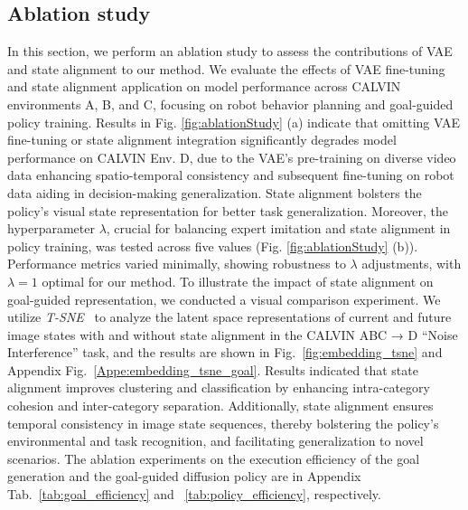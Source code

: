 \vspace{-0.5em}
\subsection{Ablation study}
\vspace{-0.5em}

In this section, we perform an ablation study to assess the contributions of VAE and state alignment to our method. 
We evaluate the effects of VAE fine-tuning and state alignment application on model performance across CALVIN environments A, B, and C, focusing on robot behavior planning and goal-guided policy training.
%
Results in Fig. \ref{fig:ablationStudy} (a) indicate that omitting VAE fine-tuning or state alignment integration significantly degrades model performance on CALVIN Env. D, due to the VAE's pre-training on diverse video data enhancing spatio-temporal consistency and subsequent fine-tuning on robot data aiding in decision-making generalization. 
State alignment bolsters the policy's visual state representation for better task generalization.
%
Moreover, the hyperparameter $\lambda$, crucial for balancing expert imitation and state alignment in policy training, was tested across five values (Fig. \ref{fig:ablationStudy} (b)). 
Performance metrics varied minimally, showing robustness to $\lambda$ adjustments, with $\lambda=1$ optimal for our method.
%
To illustrate the impact of state alignment on goal-guided representation, we conducted a visual comparison experiment.
We utilize \textit{T-SNE}~\citep{van2008visualizing} to analyze the latent space representations of current and future image states with and without state alignment in the CALVIN ABC → D “Noise Interference” task, and the results are shown in Fig.~\ref{fig:embedding_tsne} and Appendix Fig.~\ref{Appe:embedding_tsne_goal}.
Results indicated that state alignment improves clustering and classification by enhancing intra-category cohesion and inter-category separation. 
Additionally, state alignment ensures temporal consistency in image state sequences, thereby bolstering the policy's environmental and task recognition, and facilitating generalization to novel scenarios.
The ablation experiments on the execution efficiency of the goal generation and the goal-guided diffusion policy are in Appendix Tab.~\ref{tab:goal_efficiency} and ~\ref{tab:policy_efficiency}, respectively.




